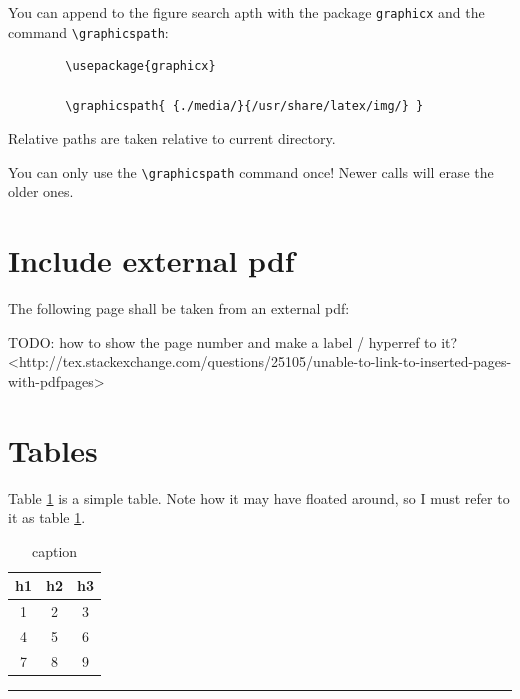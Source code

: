\documentclass[12pt]{article}
\newcommand{\inOut}[1]{#1}                                %
\begin{document}
    You can append to the figure search apth with the package \lstinline|graphicx| and the command \lstinline|\graphicspath|:

    \begin{lstlisting}
        \usepackage{graphicx}

        \graphicspath{ {./media/}{/usr/share/latex/img/} }
    \end{lstlisting}

    Relative paths are taken relative to current directory.

    You can only use the \lstinline|\graphicspath| command once! Newer calls will erase the older ones.

%

\section{Include external pdf}\label{extPdf}

The following page shall be taken from an external pdf:



TODO: how to show the page number and make a label / hyperref to it?
<http://tex.stackexchange.com/questions/25105/unable-to-link-to-inserted-pages-with-pdfpages>

\section{Tables}\label{secTab}

    \begin{example} \label{expTab1}
        Table \ref{tab1} is a simple table. Note how it may have floated around, so I must refer to it as table \ref{tab1}.
        \inOut{
            \begin{table}[h]
                \centering
                \begin{tabular}{ccc}
                    h1 & h2 & h3 \\
                    \hline
                    1 & 2 & 3 \\
                    4 & 5 & 6 \\
                    7 & 8 & 9 \\
                \end{tabular}
                \caption{caption}
                \label{tab1}
            \end{table}
        }
    \end{example}\hrule
\end{document}

